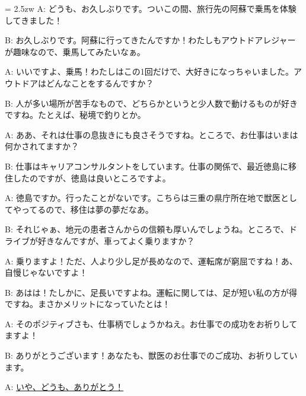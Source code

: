 \documentclass[11pt]{amsart}
\title{}
\author{}
\newenvironment{hangall}[1]{\hangindent = 2.5zw\everypar{\hangindent = 2.5zw}}{}
\begin{document}
\maketitle
\begin{hangall}{}%
A: どうも、お久しぶりです。ついこの間、旅行先の阿蘇で乗馬を体験してきました！

B: お久しぶりです。阿蘇に行ってきたんですか！わたしもアウトドアレジャーが趣味なので、乗馬してみたいなぁ。

A: いいですよ、乗馬！わたしはこの1回だけで、大好きになっちゃいました。アウトドアはどんなことをするんですか？

B: 人が多い場所が苦手なもので、どちらかというと少人数で動けるものが好きですね。たとえば、秘境で釣りとか。

A: ああ、それは仕事の息抜きにも良さそうですね。ところで、お仕事はいまは何かされてますか？

B: 仕事はキャリアコンサルタントをしています。仕事の関係で、最近徳島に移住したのですが、徳島は良いところですよ。

A: 徳島ですか。行ったことがないです。こちらは三重の県庁所在地で獣医としてやってるので、移住は夢の夢だなあ。

B: それじゃぁ、地元の患者さんからの信頼も厚いんでしょうね。ところで、ドライブが好きなんですが、車ってよく乗りますか？

A: 乗りますよ！ただ、人より少し足が長めなので、運転席が窮屈ですね！あ、自慢じゃないですよ！

B: あはは！たしかに、足長いですよね。運転に関しては、足が短い私の方が得ですね。まさかメリットになっていたとは！

A: そのポジティブさも、仕事柄でしょうかねえ。お仕事での成功をお祈りしてますよ！

B: ありがとうございます！あなたも、獣医のお仕事でのご成功、お祈りしています。

A: \ul{いや、どうも、ありがとう！}\end{hangall}
\end{document}
